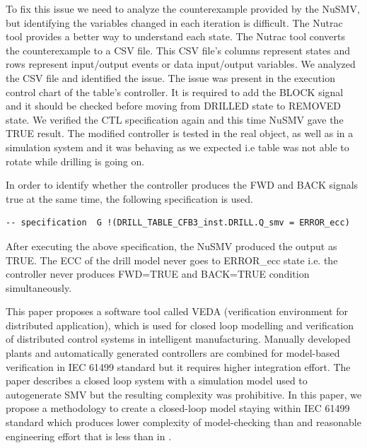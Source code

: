 \begin{bibunit}
To fix this issue we need to analyze the counterexample provided by the NuSMV, but identifying the variables changed in each iteration is difficult. The Nutrac tool provides a better way to understand each state. The Nutrac tool converts the counterexample to a CSV file. This CSV file's columns represent states and rows represent input/output events or data input/output variables. We analyzed the CSV file and identified the issue. The issue was present in the execution control chart of the table's controller. It is required to add the BLOCK signal and it should be checked before moving from DRILLED state to REMOVED state. We verified the CTL specification again and this time NuSMV gave the TRUE result. The modified controller is tested in the real object, as well as in a simulation system and it was behaving as we expected i.e table was not able to rotate while drilling is going on.

In order to identify whether the  controller produces the {FWD} and {BACK} signals true at the same time, the following specification is used.

\begin{lstlisting}[breaklines,basicstyle=\small]
-- specification  G !(DRILL_TABLE_CFB3_inst.DRILL.Q_smv = ERROR_ecc)
\end{lstlisting}
 

After executing the above specification, the NuSMV produced the output as  TRUE.  The ECC of the drill model never goes to ERROR\_ecc state i.e. the controller never produces {FWD=TRUE} and {BACK=TRUE} condition simultaneously.  


This paper \cite{vyatkin2003verification} proposes  a software tool called VEDA (verification environment for distributed application), which is used for closed loop modelling and verification of distributed  control systems in intelligent manufacturing. Manually developed plants and automatically generated controllers are combined for model-based verification in IEC 61499 standard but it requires higher integration effort. The  paper \cite{Time-AwareComputations1} \cite{Time-AwareComputations2} describes a closed loop system with a simulation model used to autogenerate SMV but the resulting complexity was prohibitive. In this paper, we propose a methodology to create a closed-loop model staying within IEC 61499 standard which produces  lower complexity of model-checking than \cite{Time-AwareComputations1} \cite{Time-AwareComputations2} and reasonable engineering effort that is less than in \cite{vyatkin2003verification}.  


\end{bibunit}
